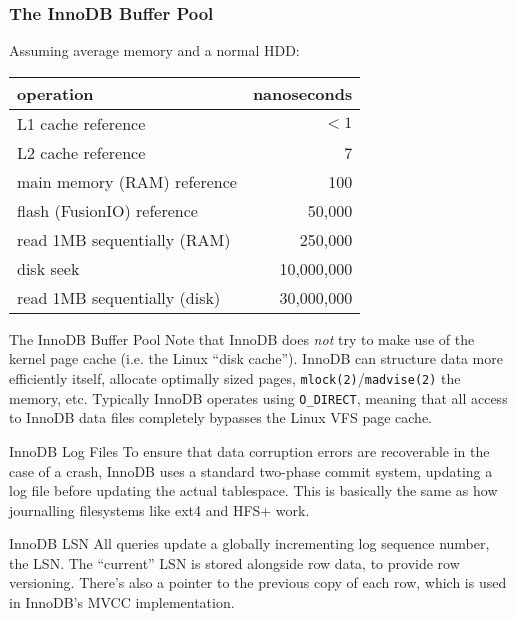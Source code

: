 \documentclass[14pt]{beamer}
\begin{document}
\begin{frame}[fragile]
  \frametitle{The InnoDB Buffer Pool}
  Assuming average memory and a normal HDD:
  \begin{table}[ht]
    \begin{tabular}{l r}
      operation                    & nanoseconds \\ \hline
      L1 cache reference           & $<1$        \\
      L2 cache reference           & 7           \\
      main memory (RAM) reference  & 100         \\
      flash (FusionIO) reference   & 50,000      \\
      read 1MB sequentially (RAM)  & 250,000     \\
      disk seek                    & 10,000,000  \\
      read 1MB sequentially (disk) & 30,000,000  \\
    \end{tabular}
  \end{table}
\end{frame}

\begin{frame}{The InnoDB Buffer Pool}
  Note that InnoDB does \emph{not} try to make use of the kernel page cache
  (i.e. the Linux ``disk cache''). InnoDB can structure data more efficiently
  itself, allocate optimally sized pages, \texttt{mlock(2)}/\texttt{madvise(2)}
  the memory, etc.
  \newline
  \newline
  Typically InnoDB operates using \texttt{O\_DIRECT}, meaning that all access to
  InnoDB data files completely bypasses the Linux VFS page cache.
\end{frame}

\begin{frame}{InnoDB Log Files}
  To ensure that data corruption errors are recoverable in the case of a crash,
  InnoDB uses a standard two-phase commit system, updating a log file before
  updating the actual tablespace.
  \newline
  \newline
  This is basically the same as how journalling filesystems like ext4 and HFS+ work.
\end{frame}

\begin{frame}{InnoDB LSN}
  All queries update a globally incrementing log sequence number, the LSN. The
  ``current'' LSN is stored alongside row data, to provide row versioning.
  \newline
  \newline
  There's also a pointer to the previous copy of each row, which is used in
  InnoDB's MVCC implementation.
\end{frame}
\end{document}
